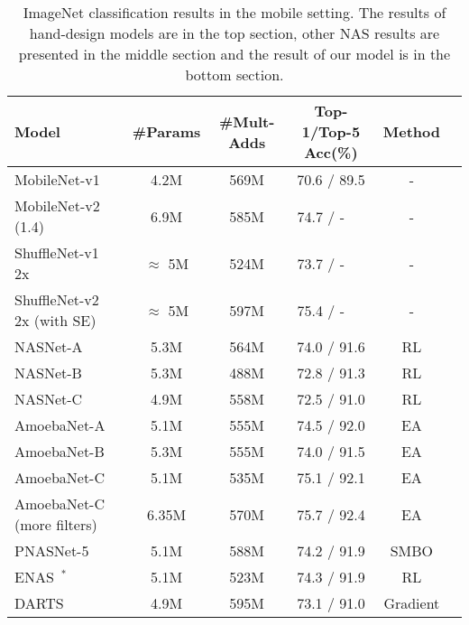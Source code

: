 \documentclass[10pt,twocolumn,letterpaper]{article}
\begin{document}
  \begin{table*}[!hbt]
  \centering
  \caption{ImageNet classification results in the mobile setting. The results of hand-design models are in the top section, other NAS results are presented in the middle section and the result of our model is in the bottom section.} \label{tab:2}
      \begin{threeparttable}
  \begin{tabular}{ l  c  c  c c c}
  \hline
      \textbf{Model} 			      		 & \textbf{\#Params} & \textbf{\#Mult-Adds} & \textbf{Top-1/Top-5 Acc(\%)}  & \textbf{ Method}\\ 
      \hline  
	MobileNet-v1~\cite{howard2017mobilenets}			 & 4.2M		   &    569M			& 70.6 / 89.5	     & - \\
	MobileNet-v2 (1.4)\cite{sandler2018inverted}		 & 6.9M		   &	 585M			& 74.7 / -$\;\;\;\;\;$	   		  & -\\
	ShuffleNet-v1 2x~\cite{zhang2017shufflenet}			 &  $ \approx $ 5M			   &    524M			& 73.7 / -$\;\;\;\;\;$	    		& -\\
	ShuffleNet-v2 2x  (with SE)~\cite{DBLP:journals/corr/abs-1807-11164}			 & $ \approx $ 5M			   &    597M			& 75.4 / -$\;\;\;\;\;$	   & -\\

      \hline
	NASNet-A~\cite{zoph2017learning}		 & 5.3M		   &	 564M			& 74.0 / 91.6	  & RL\\
	NASNet-B~\cite{zoph2017learning}		 & 5.3M		   &	 488M			& 72.8 / 91.3	  & RL\\
	NASNet-C~\cite{zoph2017learning}		 & 4.9M		   &	 558M			& 72.5 / 91.0	  & RL\\
	AmoebaNet-A~\cite{Real2018Regularized}	 & 5.1M		   &    555M			& 74.5 / 92.0	 & EA\\
	AmoebaNet-B~\cite{Real2018Regularized}	 & 5.3M		   &    555M			& 74.0 / 91.5 	   & EA\\
	AmoebaNet-C~\cite{Real2018Regularized}	 & 5.1M		   &    535M			& 75.1 / 92.1	   & EA\\
	AmoebaNet-C (more filters)~\cite{Real2018Regularized}	 & 6.35M		   &    570M			& 75.7 / 92.4	 & EA\\
	PNASNet-5~\cite{liu2017progressive}		 & 5.1M		   &	 588M			& 74.2 / 91.9	  & SMBO\\
	ENAS~\cite{pham2018efficient}$^*$		  &	5.1M						&	  523M				& 74.3 / 91.9 	 & RL\\
	DARTS~\cite{DBLP:journals/corr/abs-1806-09055}		  &	4.9M		&	  595M					& 73.1 / 91.0 	 & Gradient\\


\end{tabular}
\end{threeparttable}
\end{table*}
\end{document}
